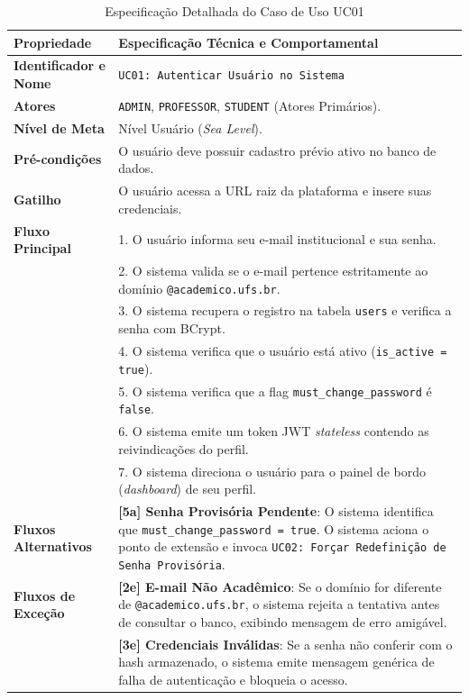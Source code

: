 \begin{table}[!ht]
\centering
\caption{Especificação Detalhada do Caso de Uso UC01}
\label{tab_uc01}
\footnotesize
\begin{tabularx}{\textwidth}{p{3.5cm} X}
\toprule
\textbf{Propriedade} & \textbf{Especificação Técnica e Comportamental} \\
\midrule
\textbf{Identificador e Nome} & \texttt{UC01: Autenticar Usuário no Sistema} \\
\textbf{Atores} & \texttt{ADMIN}, \texttt{PROFESSOR}, \texttt{STUDENT} (Atores Primários). \\
\textbf{Nível de Meta} & Nível Usuário (\textit{Sea Level}). \\
\textbf{Pré-condições} & O usuário deve possuir cadastro prévio ativo no banco de dados. \\
\textbf{Gatilho} & O usuário acessa a URL raiz da plataforma e insere suas credenciais. \\
\textbf{Fluxo Principal} & 
1. O usuário informa seu e-mail institucional e sua senha.\\
& 2. O sistema valida se o e-mail pertence estritamente ao domínio \texttt{@academico.ufs.br}.\\
& 3. O sistema recupera o registro na tabela \texttt{users} e verifica a senha com BCrypt.\\
& 4. O sistema verifica que o usuário está ativo (\texttt{is\_active = true}).\\
& 5. O sistema verifica que a flag \texttt{must\_change\_password} é \texttt{false}.\\
& 6. O sistema emite um token JWT \textit{stateless} contendo as reivindicações do perfil.\\
& 7. O sistema direciona o usuário para o painel de bordo (\textit{dashboard}) de seu perfil. \\
\textbf{Fluxos Alternativos} & 
\textbf{[5a] Senha Provisória Pendente}: O sistema identifica que \texttt{must\_change\_password = true}. O sistema aciona o ponto de extensão e invoca \texttt{UC02: Forçar Redefinição de Senha Provisória}. \\
\textbf{Fluxos de Exceção} & 
\textbf{[2e] E-mail Não Acadêmico}: Se o domínio for diferente de \texttt{@academico.ufs.br}, o sistema rejeita a tentativa antes de consultar o banco, exibindo mensagem de erro amigável.\\
& \textbf{[3e] Credenciais Inválidas}: Se a senha não conferir com o hash armazenado, o sistema emite mensagem genérica de falha de autenticação e bloqueia o acesso.\\

\end{tabularx}
\end{table}
